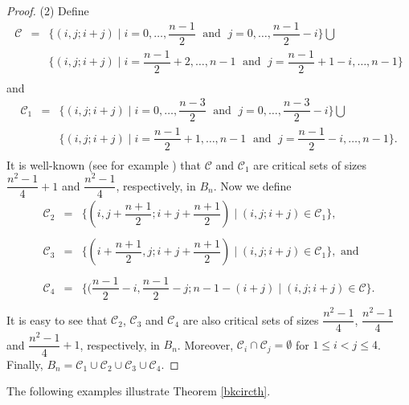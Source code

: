 \documentclass[11pt]{article}
\begin{document}
\begin{proof}
\noindent (2) Define 
$$\begin{array}{lcl}
{\mathcal C} & = & \{(i,j;i+j)\mid i=0,\ldots,\dfrac{n-1}{2}\;
\mbox{ and }\;j=0,\ldots,\dfrac{n-1}{2}-i\}\bigcup \\
& & \{(i,j;i+j)\mid i=\dfrac{n-1}{2}+2,\ldots,n-1\;
\mbox{ and }\;j=\dfrac{n-1}{2}+1-i,\ldots,n-1\}\\
\end{array}$$
and
$$\begin{array}{lcl}
{\mathcal C}_1 & = & \{(i,j;i+j)\mid i=0,\ldots,\dfrac{n-3}{2}\;
\mbox{ and }\;j=0,\ldots,\dfrac{n-3}{2}-i\}\bigcup \\
& & \{(i,j;i+j)\mid i=\dfrac{n-1}{2}+1,\ldots,n-1\;
\mbox{ and }\;j=\dfrac{n-1}{2}-i,\ldots,n-1\}. \\
\end{array}$$
It is well-known (see for example \cite{doco}) that 
${\mathcal C}$ and ${\mathcal C}_1$ are  
critical sets of sizes $\dfrac{n^2-1}{4}+1$ and $\dfrac{n^2-1}{4}$,
respectively, in $B_n$. Now we define
$$\begin{array}{lcl}
{\mathcal C}_2 & = & \{(i,j+\dfrac{n+1}{2};i+j+\dfrac{n+1}{2})\mid 
(i,j;i+j)\in {\mathcal C}_1\}, \\
&&\\
{\mathcal C}_3 & = & \{(i+\dfrac{n+1}{2},j;i+j+\dfrac{n+1}{2})\mid 
(i,j;i+j)\in {\mathcal C}_1\}, \mbox{ and}  \\
&&\\
{\mathcal C}_4 & = & \{(\dfrac{n-1}{2}-i,\dfrac{n-1}{2}-j;n-1-(i+j)\mid 
(i,j;i+j)\in {\mathcal C}\}. \\
\end{array}$$
It is easy to see that ${\mathcal C}_2$, ${\mathcal C}_3$ and
${\mathcal C}_4$ are also critical sets of 
sizes $\dfrac{n^2-1}{4}$, $\dfrac{n^2-1}{4}$ and $\dfrac{n^2-1}{4}+1$,
respectively, in $B_n$. Moreover,
${\mathcal C}_i\cap {\mathcal C}_j=\emptyset$ for $1\leq i<j\leq 4$.
Finally,
$B_n= {\mathcal C}_1\cup {\mathcal C}_2\cup {\mathcal C}_3\cup 
{\mathcal C}_4.$
\end{proof}

The following examples illustrate Theorem \ref{bkcircth}.
\end{document}
